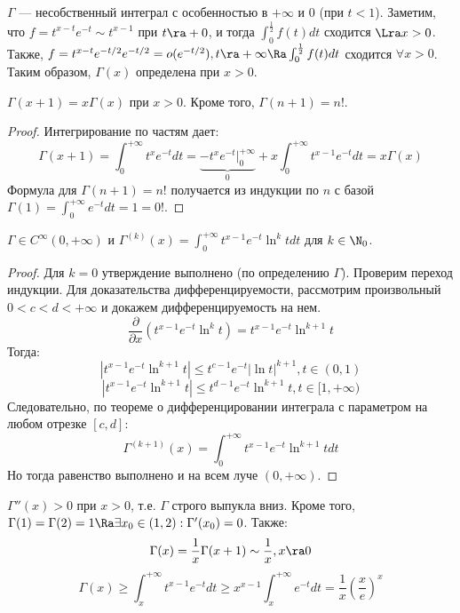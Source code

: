 \begin{note}
    \(\Gamma\) --- несобственный интеграл с особенностью в \(+\infty\) и \(0\) (при \(t < 1\)). Заметим, что \(f = t^{x - t}e^{-t} \sim t^{x - 1}\) при \(t \ra +0\), и тогда \(\int_0^{\frac{1}{2}} f(t)dt\) сходится \(\Lra x > 0\). Также, \(f = t^{x - t}e^{-t/2}e^{-t/2} = o(e^{-t/2}), t \ra +\infty \Ra \int_0^{\frac{1}{2}} f(t)dt\) сходится \(\forall x > 0\). Таким образом, \(\Gamma(x)\) определена при \(x > 0\).
\end{note}

\begin{lemma}
    \(\Gamma(x + 1) = x\Gamma(x)\) при \(x > 0\). Кроме того, \(\Gamma(n + 1) = n!\).
\end{lemma}
\begin{proof}
    Интегрирование по частям дает:
    \[\Gamma(x + 1) = \int_0^{+\infty}t^xe^{-t}dt = \underbrace{-t^{x}e^{-t}\big|_0^{+\infty}}_{0} + x\int_0^{+\infty}t^{x - 1}e^{-t}dt = x\Gamma(x)\]
    Формула для \(\Gamma(n + 1) = n!\) получается из индукции по \(n\) с базой \(\Gamma(1) = \int_0^{+\infty} e^{-t}dt = 1 = 0!\).
\end{proof}

\begin{lemma}
    \(\Gamma \in C^{\infty}(0, +\infty)\) и \(\Gamma^{(k)}(x) = \int_0^{+\infty}t^{x - 1}e^{-t}\ln^ktdt\) для \(k \in \N_0\).
\end{lemma}
\begin{proof}
    Для \(k = 0\) утверждение выполнено (по определению \(\Gamma\)). Проверим переход индукции. Для доказательства дифференцируемости, рассмотрим произвольный \(0 < c < d < +\infty\) и докажем дифференцируемость на нем.
    \[\frac{\partial}{\partial x}\left( t^{x - 1}e^{-t}\ln^kt \right) = t^{x - 1}e^{-t}\ln^{k + 1}t\]
    Тогда:
    \[|t^{x - 1}e^{-t}\ln^{k + 1}t| \le t^{c - 1}e^{-t}|\ln t|^{k + 1}, t \in (0, 1)\]
    \[|t^{x - 1}e^{-t}\ln^{k + 1}t| \le t^{d - 1}e^{-t}\ln^{k + 1} t, t \in [1, +\infty)\]
    Следовательно, по теореме о дифференцировании интеграла с параметром на любом отрезке \([c, d]\):
    \[\Gamma^{(k + 1)}(x) = \int_0^{+\infty}t^{x - 1}e^{-t}\ln^{k + 1}tdt\]
    Но тогда равенство выполнено и на всем луче \((0, +\infty)\).
\end{proof}

\begin{note}
    \(\Gamma''(x) > 0\) при \(x > 0\), т.е. \(\Gamma\) строго выпукла вниз. Кроме того, \(\Gamma(1) = \Gamma(2) = 1 \Ra \exists x_0 \in (1, 2): \Gamma'(x_0) = 0\). Также:
    \[\Gamma(x) = \frac{1}{x}\Gamma(x + 1) \sim \frac{1}{x}, x \ra 0\]
    \[\Gamma(x) \ge \int_x^{+\infty} t^{x - 1}e^{-t}dt \ge x^{x - 1}\int_x^{+\infty}e^{-t}dt = \frac{1}{x}\left( \frac{x}{e} \right)^x\]
\end{note}

